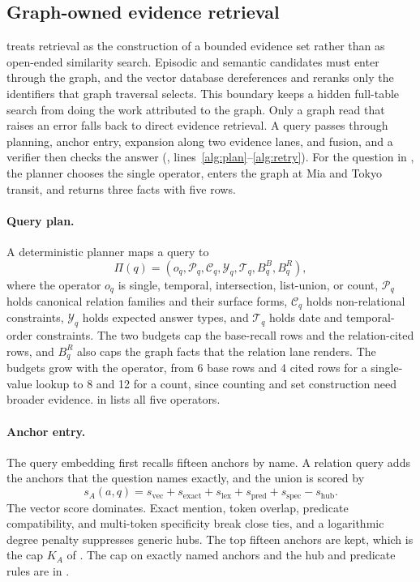 \subsection{Graph-owned evidence retrieval}
\label{sec:retrieval}

\method treats retrieval as the construction of a bounded evidence set rather
than as open-ended similarity search. Episodic and semantic candidates must
enter through the graph, and the vector database dereferences and reranks only the
identifiers that graph traversal selects. This boundary keeps a hidden
full-table search from doing the work attributed to the graph. Only a graph
read that raises an error falls back to direct evidence retrieval. A query passes
through planning, anchor entry, expansion along two evidence lanes, and fusion,
and a verifier then checks the answer
(, lines~\ref{alg:plan}--\ref{alg:retry}). For the question in
, the planner chooses the single operator, enters
the graph at Mia and Tokyo transit, and returns three facts with five rows.

\paragraph{Query plan.}
A deterministic planner maps a query to
\begin{equation}
    \Pi(q)=
    \left(
        o_q,\mathcal P_q,\mathcal C_q,\mathcal Y_q,\mathcal T_q,
        B_q^B,B_q^R
    \right),
    \label{eq:query-plan}
\end{equation}
where the operator \(o_q\) is single, temporal, intersection, list-union, or
count, \(\mathcal P_q\) holds canonical relation families and their surface
forms, \(\mathcal C_q\) holds non-relational constraints, \(\mathcal Y_q\) holds
expected answer types, and \(\mathcal T_q\) holds date and temporal-order
constraints. The two budgets cap the base-recall rows and the relation-cited
rows, and \(B_q^R\) also caps the graph facts that the relation lane renders.
The budgets grow with the operator, from 6 base rows and 4 cited rows for a
single-value lookup to 8 and 12 for a count, since counting and set
construction need broader evidence.
 in  lists all five
operators.

\paragraph{Anchor entry.}
The query embedding first recalls fifteen anchors by name. A relation query adds
the anchors that the question names exactly, and the union is scored by
\begin{equation}
    s_A(a,q)=s_{\mathrm{vec}}+s_{\mathrm{exact}}+
    s_{\mathrm{lex}}+s_{\mathrm{pred}}+s_{\mathrm{spec}}
    -s_{\mathrm{hub}}.
    \label{eq:anchor-score}
\end{equation}
The vector score dominates. Exact mention, token overlap, predicate
compatibility, and multi-token specificity break close ties, and a logarithmic
degree penalty suppresses generic hubs. The top fifteen anchors are kept, which
is the cap \(K_A\) of . The cap on exactly named anchors and the hub and predicate rules are in .

